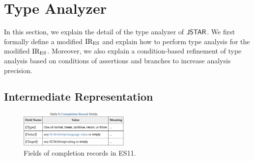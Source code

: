 \section{Type Analyzer}\label{sec:analyzer}

In this section, we explain the detail of the type analyzer of $\textsf{JSTAR}$. We first
formally define a modified ${\text{IR}_\text{ES}}$ and explain how to perform type analysis for
the modified ${\text{IR}_\text{ES}}$.  Moreover, we also explain a condition-based refinement of
type analysis based on conditions of assertions and branches to increase
analysis precision.

\subsection{Intermediate Representation}\label{sec:ires}

\begin{figure}
  \centering
  \includegraphics[width=0.48\textwidth]{img/record-fields-table}
  \vspace*{-1.5em}
  \caption{Fields of completion records in ES11.}
  \label{fig:record-fields-table}
  \vspace*{-1.5em}
\end{figure}

